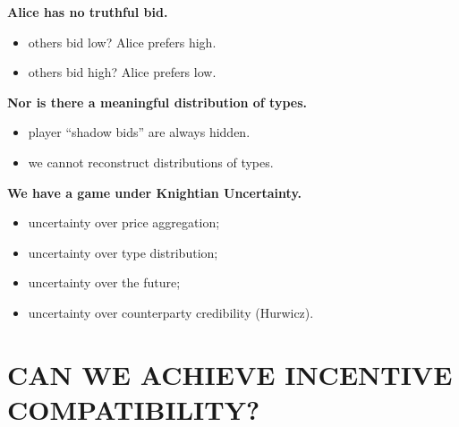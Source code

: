 \documentclass[11pt]{article}
\begin{document}
\vspace{0.30cm}

{\large\bfseries
Alice has no truthful bid.
}

\begin{itemize}

\item others bid low? Alice prefers high.

\item others bid high? Alice prefers low.

\end{itemize}

\vspace{0.20cm}

{\large\bfseries
Nor is there a meaningful distribution of types.
}

\begin{itemize}

\item player ``shadow bids'' are always hidden.

\item we cannot reconstruct distributions of types.

\end{itemize}

\vspace{0.20cm}

{\large\bfseries
We have a game under Knightian Uncertainty.
}

\begin{itemize}

\item uncertainty over price aggregation;

\item uncertainty over type distribution;

\item uncertainty over the future;

\item uncertainty over counterparty credibility (Hurwicz).

\end{itemize}


\newpage











\section*{\LARGE CAN WE ACHIEVE INCENTIVE COMPATIBILITY?}
\end{document}
